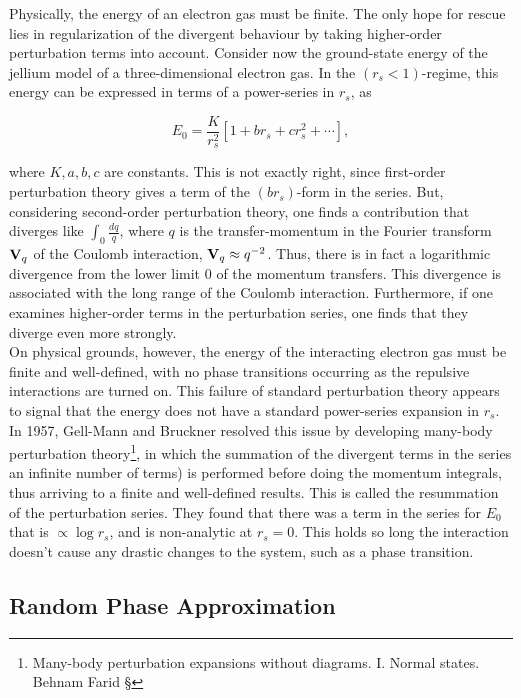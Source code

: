 \documentclass{homework}
\begin{document}
Physically, the energy of an electron gas must be finite. The only hope for rescue lies in regularization of the divergent behaviour by taking higher-order perturbation terms into account. Consider now the ground-state energy of the jellium model of a three-dimensional electron gas. In the $(r_s < 1)$-regime, this energy can be expressed in terms of a power-series in $r_s$, as

$$
    E_0 = \frac{K}{r_s^2} [1+ br_s + c r_s^2 + \cdots],
$$

where $K, a,b,c$ are constants. This is not exactly right, since first-order perturbation theory gives a term of the $(br_s)$-form in the series. But, considering second-order perturbation theory, one finds a contribution that diverges like $\int_0 \frac{dq}{q}$, where $q$ is the transfer-momentum in the Fourier transform ${\bf V}_q$ of the Coulomb interaction, ${\bf V}_q \approx q^{-2}$. Thus, there is in fact a logarithmic divergence from the lower limit $0$ of the momentum transfers. This divergence is associated with the long range of the Coulomb interaction. Furthermore, if one examines higher-order terms in the perturbation series, one finds that they diverge even more strongly. \\

On physical grounds, however, the energy of the interacting electron gas must be finite and well-defined, with no phase transitions occurring as the repulsive interactions are turned on. This failure of standard perturbation theory appears to signal that the energy does not have a standard power-series expansion in $r_s$. In 1957, Gell-Mann and Bruckner resolved this issue by developing many-body perturbation theory\footnote{Many-body perturbation expansions without diagrams.
I. Normal states. Behnam Farid §}, in which the summation of the divergent terms in the series an infinite number of terms) is performed before doing the momentum integrals, thus arriving to a finite and well-defined results. This is called the resummation of the perturbation series. They found that there was a term in the series for $E_0$ that is $\propto \log r_s$, and is non-analytic at $r_s = 0$. This holds so long the interaction doesn't cause any drastic changes to the system, such as a phase transition. \\

\subsection{Random Phase Approximation}
\end{document}

